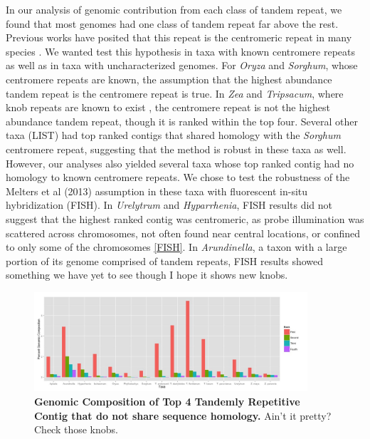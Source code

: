 \documentclass[10pt,letterpaper]{article}
\begin{document}
In our analysis of genomic contribution from each class of tandem repeat, we found that most genomes had one class of tandem repeat far above the rest.
Previous works have posited that this repeat is the centromeric repeat in many species \cite{melters2013comparative}.
We wanted test this hypothesis in taxa with known centromere repeats as well as in taxa with uncharacterized genomes.
For \emph{Oryza} and \emph{Sorghum}, whose centromere repeats are known, the assumption that the highest abundance tandem repeat is the centromere repeat is true.
In \emph{Zea} and \emph{Tripsacum}, where knob repeats are known to exist \cite{dennis1984knob}, the centromere repeat is not the highest abundance tandem repeat, though it is ranked within the top four.
Several other taxa (LIST) had top ranked contigs that shared homology with the \emph{Sorghum} centromere repeat, suggesting that the method is robust in these taxa as well.
However, our analyses also yielded several taxa whose top ranked contig had no homology to known centromere repeats.
We chose to test the robustness of the Melters et al (2013) assumption in these taxa with fluorescent in-situ hybridization (FISH).
In \emph{Urelytrum} and \emph{Hyparrhenia}, FISH results did not suggest that the highest ranked contig was centromeric, as probe illumination was scattered across chromosomes, not often found near central locations, or confined to only some of the chromosomes \ref{FISH}.
In \emph{Arundinella}, a taxon with a large portion of its genome comprised of tandem repeats, FISH results showed something we have yet to see though I hope it shows new knobs.
\\

\begin{figure}[h]
\begin{center}
\includegraphics[width=4in]{Rankstrfcontent.png}
\end{center}
\caption{{\bf Genomic Composition of Top 4 Tandemly Repetitive Contig that do not share sequence homology.} Ain't it pretty?  Check those knobs.}
\label{ranktrf}
\end{figure}
\end{document}
